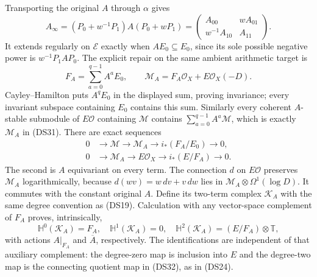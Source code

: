 \documentclass{article}
\begin{document}
Transporting the original $A$ through $\alpha$ gives
\[
 \widehat A_\infty
 =(P_0+w^{-1}P_1)A(P_0+wP_1)
 =\begin{pmatrix}A_{00}&wA_{01}\\w^{-1}A_{10}&A_{11}\end{pmatrix}.
 \tag{DS30}
\]
It extends regularly on $\mathscr E$ exactly when $AE_0\subseteq E_0$,
since its sole possible negative power is $w^{-1}P_1AP_0$.
The explicit repair on the same ambient arithmetic target is
\[
 F_A=\sum_{a=0}^{q-1}A^aE_0,\qquad
 \mathcal M_A=F_A\mathcal O_X+E\mathcal O_X(-D).
 \tag{DS31}
\]
Cayley--Hamilton puts $A^qE_0$ in the displayed sum, proving
invariance; every invariant subspace containing $E_0$ contains this
sum.  Similarly every coherent $A$-stable submodule of $E\mathcal O$
containing $\mathcal M$ contains $\sum_{a=0}^{q-1}A^a\mathcal M$,
which is exactly $\mathcal M_A$ in (DS31).  There are exact sequences
\[
\begin{split}
0&\to\mathcal M\to\mathcal M_A\to i_*(F_A/E_0)\to0,\\
0&\to\mathcal M_A\to E\mathcal O_X\to i_*(E/F_A)\to0.
\end{split}\tag{DS32}
\]
The second is $A$ equivariant on every term.  The connection $d$ on
$E\mathcal O$ preserves $\mathcal M_A$ logarithmically, because
$d(wv)=w\,dv+v\,dw$ lies in
$\mathcal M_A\otimes\Omega^1(\log D)$.  It commutes with the
constant original $A$.  Define its two-term complex $\mathscr K_A$
with the same degree convention as (DS19).  Calculation with any
vector-space complement of $F_A$ proves, intrinsically,
\[
 \mathbb H^0(\mathscr K_A)=F_A,\quad
 \mathbb H^1(\mathscr K_A)=0,\quad
 \mathbb H^2(\mathscr K_A)=(E/F_A)\otimes\mathbb T,
 \tag{DS33}
\]
with actions $A|_{F_A}$ and $\overline A$, respectively.  The
identifications are independent of that auxiliary complement: the
degree-zero map is inclusion into $E$ and the degree-two map is the
connecting quotient map in (DS32), as in (DS24).
\end{document}

